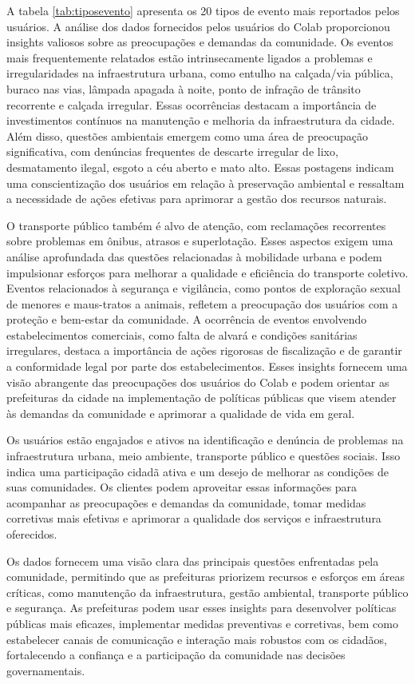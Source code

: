 A tabela \autoref{tab:tiposevento} apresenta os 20 tipos de evento mais reportados pelos usuários. A análise dos dados fornecidos pelos usuários do Colab proporcionou insights valiosos sobre as preocupações e demandas da comunidade. Os eventos mais frequentemente relatados estão intrinsecamente ligados a problemas e irregularidades na infraestrutura urbana, como entulho na calçada/via pública, buraco nas vias, lâmpada apagada à noite, ponto de infração de trânsito recorrente e calçada irregular. Essas ocorrências destacam a importância de investimentos contínuos na manutenção e melhoria da infraestrutura da cidade. Além disso, questões ambientais emergem como uma área de preocupação significativa, com denúncias frequentes de descarte irregular de lixo, desmatamento ilegal, esgoto a céu aberto e mato alto. Essas postagens indicam uma conscientização dos usuários em relação à preservação ambiental e ressaltam a necessidade de ações efetivas para aprimorar a gestão dos recursos naturais. 

O transporte público também é alvo de atenção, com reclamações recorrentes sobre problemas em ônibus, atrasos e superlotação. Esses aspectos exigem uma análise aprofundada das questões relacionadas à mobilidade urbana e podem impulsionar esforços para melhorar a qualidade e eficiência do transporte coletivo. Eventos relacionados à segurança e vigilância, como pontos de exploração sexual de menores e maus-tratos a animais, refletem a preocupação dos usuários com a proteção e bem-estar da comunidade. A ocorrência de eventos envolvendo estabelecimentos comerciais, como falta de alvará e condições sanitárias irregulares, destaca a importância de ações rigorosas de fiscalização e de garantir a conformidade legal por parte dos estabelecimentos. Esses insights fornecem uma visão abrangente das preocupações dos usuários do Colab e podem orientar as prefeituras da cidade na implementação de políticas públicas que visem atender às demandas da comunidade e aprimorar a qualidade de vida em geral.

Os usuários estão engajados e ativos na identificação e denúncia de problemas na infraestrutura urbana, meio ambiente, transporte público e questões sociais. Isso indica uma participação cidadã ativa e um desejo de melhorar as condições de suas comunidades. Os clientes podem aproveitar essas informações para acompanhar as preocupações e demandas da comunidade, tomar medidas corretivas mais efetivas e aprimorar a qualidade dos serviços e infraestrutura oferecidos.

Os dados fornecem uma visão clara das principais questões enfrentadas pela comunidade, permitindo que as prefeituras priorizem recursos e esforços em áreas críticas, como manutenção da infraestrutura, gestão ambiental, transporte público e segurança. As prefeituras podem usar esses insights para desenvolver políticas públicas mais eficazes, implementar medidas preventivas e corretivas, bem como estabelecer canais de comunicação e interação mais robustos com os cidadãos, fortalecendo a confiança e a participação da comunidade nas decisões governamentais.

